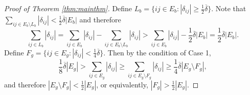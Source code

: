 \begin{proof}[Proof of Theorem \ref{thm:mainthm}]
Define $L_{b}=\{ij\in E_{b}:|\delta_{ij}|\ge\frac{1}{2}\overline{\delta}\}$.
Note that $\sum_{ij\in E_{b}\setminus L_{b}}|\delta_{ij}|<\frac{1}{2}\overline{\delta}|E_{b}|$
and therefore 
\begin{equation}
\sum_{ij\in L_{b}}|\delta_{ij}|=\sum_{ij\in E_{b}}|\delta_{ij}|-\sum_{ij\in E_{b}\setminus L_{b}}|\delta_{ij}|>\sum_{ij\in E_{b}}|\delta_{ij}|-\frac{1}{2}\overline{\delta}|E_{b}|=\frac{1}{2}\overline{\delta}|E_{b}|.\label{eq:large_delta}
\end{equation}
Define $F_{g}=\{ij\in E_{g}:|\delta_{ij}|<\frac{1}{4}\overline{\delta}\}$.
Then by the condition of Case 1,
\[
\frac{1}{8}\overline{\delta}|E_{g}|>\sum_{ij\in E_{g}}|\delta_{ij}|\ge\sum_{ij\in E_{g}\setminus F_{g}}|\delta_{ij}|\ge\frac{1}{4}\overline{\delta}|E_{g}\setminus F_{g}|,
\]
and therefore $|E_{g}\setminus F_{g}|<\frac{1}{2}|E_{g}|$, or equivalently,
$|F_{g}|>\frac{1}{2}|E_{g}|$.


\end{proof}
